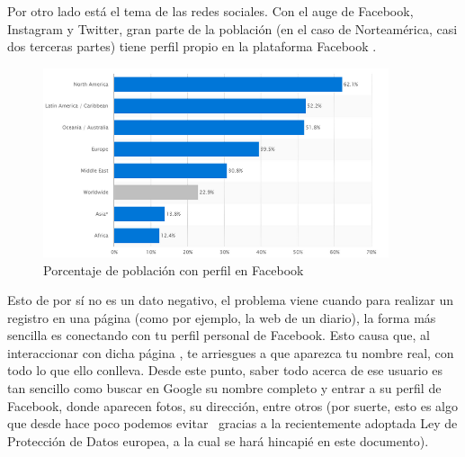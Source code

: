 Por otro lado está el tema de las redes sociales. Con el auge de
Facebook, Instagram y Twitter, gran parte de la población (en el caso
de Norteamérica, casi dos terceras partes) tiene perfil propio en la
plataforma Facebook .

\begin{figure}[h]
	\centerline{
		\mbox{\includegraphics[width=4.00in]{images/sn.png}}
	}
	\caption{Porcentaje de población con perfil en Facebook~\cite{article:FacebookStats} }
	\label{fig:FBStats}
\end{figure}

Esto de por sí no es un dato negativo, el problema viene cuando para
realizar un registro en una página (como por ejemplo, la web de un
diario), la forma más sencilla es conectando con tu perfil personal de
Facebook. Esto causa que, al interaccionar con dicha página  , te
arriesgues a que aparezca tu nombre real, con todo lo que ello
conlleva. Desde este punto, saber todo acerca de ese usuario es tan
sencillo como buscar en Google su nombre completo y entrar a su perfil
de Facebook, donde aparecen fotos, su dirección, entre otros (por
suerte, esto es algo que desde hace poco podemos
evitar~\cite{article:GDPRGoogle} gracias a la recientemente adoptada
Ley de Protección de Datos europea,  a la cual se hará hincapié en este
documento).

